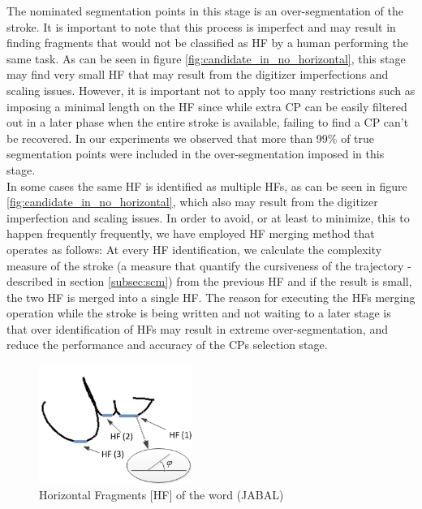 \documentclass[journal,compsoc]{IEEEtran}
\begin{document}

The nominated segmentation points in this stage is an over-segmentation of the stroke. It is important to note that this process is imperfect and may result in finding fragments that would not be classified as HF by a human performing the same task. As can be seen in figure \ref{fig:candidate_in_no_horizontal}, this stage may find very small HF that may result from the digitizer imperfections and scaling issues. However, it is important not to apply too many restrictions such as imposing a minimal length on the HF since while extra CP can be easily filtered out in a later phase when the entire stroke is available, failing to find a CP can't be recovered. In our experiments we observed that more than 99\% of true segmentation points were included in the over-segmentation imposed in this stage.\\

In some cases the same HF is identified as multiple HFs, as can be seen in figure \ref{fig:candidate_in_no_horizontal}, which also may result from the digitizer imperfection and scaling issues. In order to avoid, or at least to minimize, this to happen frequently frequently, we have employed HF merging method that operates as follows: At every HF identification, we calculate the complexity measure of the stroke (a measure that quantify the cursiveness of the trajectory - described in section \ref{subsec:scm}) from the previous HF and if the result is small, the two HF is merged into a single HF. The reason for executing the HFs merging operation while the stroke is being written and not waiting to a later stage is that over identification of HFs may result in extreme over-segmentation, and reduce the performance and accuracy of the CPs selection stage.

\begin{figure}
\centering
\includegraphics[width=5cm]{./figures/horizontal_fragments}
\caption{Horizontal Fragments [HF] of the word (JABAL)}
\label{fig:horizontal_fragments}
\end{figure}
\end{document}
